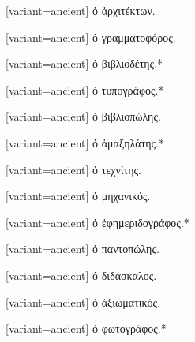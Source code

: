 \switchcolumn*
{}%
\switchcolumn
\begin{greek}[variant=ancient]%
ὁ ἀρχιτέκτων.%
\end{greek}%
\switchcolumn*
{}%
\switchcolumn
\begin{greek}[variant=ancient]%
ὁ γραμματοφόρος.%
\end{greek}%
\switchcolumn*
{}%
\switchcolumn
\begin{greek}[variant=ancient]%
ὁ βιβλιοδέτης.{*}%
\end{greek}%
\switchcolumn*
{}%
\switchcolumn
\begin{greek}[variant=ancient]%
ὁ τυπογράφος.{*}%
\end{greek}%
\switchcolumn*
{}%
\switchcolumn
\begin{greek}[variant=ancient]%
ὁ βιβλιοπώλης.%
\end{greek}%
\switchcolumn*
{}%
\switchcolumn
\begin{greek}[variant=ancient]%
ὁ ἁμαξηλάτης.{*}%
\end{greek}%
\switchcolumn*
{}%
\switchcolumn
\begin{greek}[variant=ancient]%
ὁ τεχνίτης.%
\end{greek}%
\switchcolumn*
{}%
\switchcolumn
\begin{greek}[variant=ancient]%
ὁ μηχανικός.%
\end{greek}%
\switchcolumn*
{}%
\switchcolumn
\begin{greek}[variant=ancient]%
ὁ ἐφημεριδογράφος.{*}%
\end{greek}%
\switchcolumn*
{}%
\switchcolumn
\begin{greek}[variant=ancient]%
ὁ παντοπώλης.%
\end{greek}%
\switchcolumn*
{}%
\switchcolumn
\begin{greek}[variant=ancient]%
ὁ διδάσκαλος.%
\end{greek}%
\switchcolumn*
{}%
\switchcolumn
\begin{greek}[variant=ancient]%
ὁ ἀξιωματικός.%
\end{greek}%
\switchcolumn*
{}%
\switchcolumn
\begin{greek}[variant=ancient]%
ὁ φωτογράφος.{*}%
\end{greek}%
\switchcolumn*
{}%
\switchcolumn
